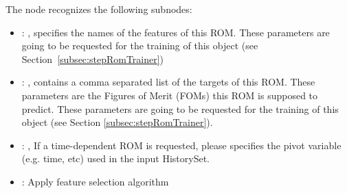   The  node recognizes the following subnodes:
  \begin{itemize}
    \item {}: ,
      specifies the names of the features of this ROM.         \nb These parameters are going to be
      requested for the training of this object         (see Section~\ref{subsec:stepRomTrainer})

    \item {}: ,
      contains a comma separated list of the targets of this ROM. These parameters         are the
      Figures of Merit (FOMs) this ROM is supposed to predict.         \nb These parameters are
      going to be requested for the training of this         object (see Section
      \ref{subsec:stepRomTrainer}).

    \item {}: ,
      If a time-dependent ROM is requested, please specifies the pivot         variable (e.g. time,
      etc) used in the input HistorySet.

    \item {}:
      Apply feature selection algorithm


\end{itemize}
